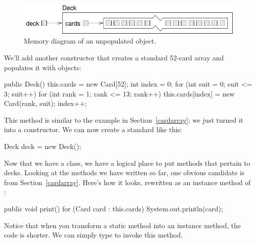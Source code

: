 \begin{figure}[!ht]
\begin{center}
\includegraphics{figs/deckobject.pdf}
\caption{Memory diagram of an unpopulated  object.}
\label{fig.deckobject}
\end{center}
\end{figure}

We'll add another constructor that creates a standard 52-card array and populates it with  objects:

\begin{code}
public Deck() {
    this.cards = new Card[52];
    int index = 0;
    for (int suit = 0; suit <= 3; suit++) {
        for (int rank = 1; rank <= 13; rank++) {
            this.cards[index] = new Card(rank, suit);
            index++;
        }
    }
}
\end{code}

This method is similar to the example in Section~\ref{cardarray}; we just turned it into a constructor.
We can now create a standard  like this:

\begin{code}
Deck deck = new Deck();
\end{code}


Now that we have a  class, we have a logical place to put methods that pertain to decks.
Looking at the methods we have written so far, one obvious candidate is  from Section~\ref{cardarray}.
Here's how it looks, rewritten as an instance method of :

\begin{code}
public void print() {
    for (Card card : this.cards) {
        System.out.println(card);
    }
}
\end{code}


Notice that when you transform a static method into an instance method, the code is shorter.
We can simply type  to invoke this method.


